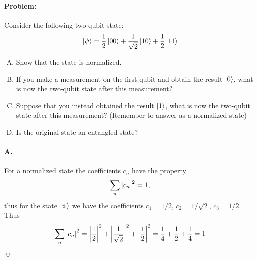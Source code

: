 \paragraph{Problem:} Consider the following two-qubit state:
\begin{equation*}
    \ket{\psi} = \frac{1}{2} \ket{00} + \frac{1}{\sqrt{2}} \ket{10} + \frac{1}{2} \ket{11}
\end{equation*}
\begin{enumerate}[A.]
    \item Show that the state is normalized.
    \item If you make a measurement on the first qubit and obtain the result $\ket{0}$, what is now the two-qubit state after this measurement?
    \item Suppose that you instead obtained the result $\ket{1}$, what is now the two-qubit state after this measurement? (Remember to answer as a normalized state)
    \item Is the original state an entangled state?
\end{enumerate}

\paragraph{A.} For a normalized state the coefficients $c_n$ have the property 
\begin{equation*}
    \sum_n \abs{c_n}^2 = 1,
\end{equation*}
thus for the state $\ket{\psi}$ we have the coefficients $c_1 = 1/2$, $c_2 = 1 / \sqrt{2}$, $c_3 = 1 / 2$. Thus
\begin{equation*}
    \sum_n \abs{c_n}^2 = \abs{\frac{1}{2}}^2 + \abs{\frac{1}{\sqrt{2}}}^2 + \abs{\frac{1}{2}}^2 = \frac{1}{4} +\frac{1}{2} + \frac{1}{4} = 1
\end{equation*}
\qed

